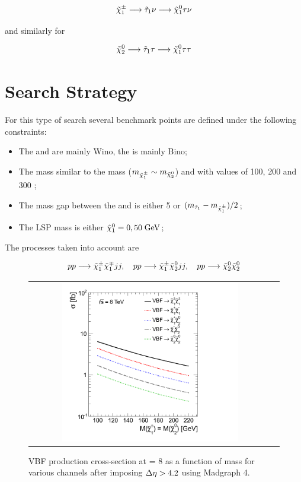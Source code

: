 \begin{equation}
\tilde{\chi}^{\pm}_{1} \longrightarrow \tilde{\tau}_{1} \nu \longrightarrow \tilde{\chi}^{0}_{1} \tau \nu
\end{equation}

and similarly for \neutralinotwo

\begin{equation}
\tilde{\chi}^{0}_{2} \longrightarrow \tilde{\tau}_{1} \tau \longrightarrow \tilde{\chi}^{0}_{1} \tau \tau
\end{equation}

\section {Search Strategy}
\label{section::search_strategy}

For this type of search several benchmark points are defined under the following constraints:
\begin{itemize}
	\item The \charginopm and \neutralinotwo are mainly Wino, the \neutralinoone is mainly Bino;
	\item The \charginomp mass similar to the \neutralinotwo mass ($m_{\tilde{\chi}^{\pm}_{1}} \sim m_{\tilde{\chi}^{0}_{2}}$) and with values of 100, 200 and 300 \gev;
	\item The mass gap between the \stau and \charginopm is either 5 \gev or $(m_{\tilde{\tau}_{1}} - m_{\tilde{\chi}^{\pm}_{1}})/2$;
	\item The LSP mass is either $\tilde{\chi}^{0}_{1} = 0 , 50 \;\text{Ge}\kern-0.06667em\text{V}$;
\end{itemize}

The processes taken into account are

\begin{equation}
pp \longrightarrow \tilde{\chi}^{\pm}_{1} \tilde{\chi}^{\mp}_{1} jj, \quad pp \longrightarrow \tilde{\chi}^{\pm}_{1} \tilde{\chi}^{0}_{2} jj, \quad pp \longrightarrow \tilde{\chi}^{0}_{2} \tilde{\chi}^{0}_{2}
\end{equation}

\begin{figure}[tbh!]
	\centering
	\begin{tabular}{cc}
		\includegraphics[width=0.75\textwidth]{analysis/pics/VBFXsection.png}
	\end{tabular}
	\caption{VBF production cross-section at \CM = 8 \tev as a function of mass for various channels after imposing \ensuremath{\deltaeta > 4.2} using Madgraph 4.}
	\label{fig:VBF_xsec}
\end{figure}

